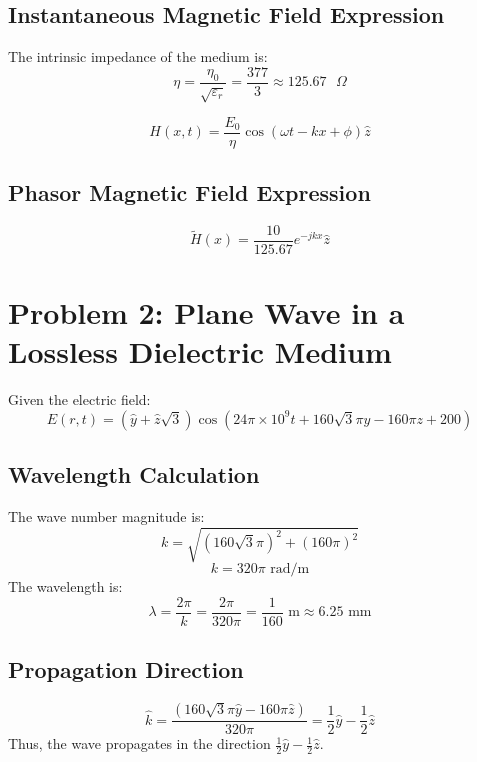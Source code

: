 \documentclass{include/src/sbu-report}  %
\begin{document}
\subsection{Instantaneous Magnetic Field Expression}
The intrinsic impedance of the medium is:
\begin{equation}
    \eta = \frac{\eta_0}{\sqrt{\varepsilon_r}} = \frac{377}{3} \approx 125.67 \text{ } \Omega
\end{equation}

\begin{equation}
    H(x,t) = \frac{E_0}{\eta} \cos(\omega t - kx + \phi) \hat{z}
\end{equation}

\subsection{Phasor Magnetic Field Expression}
\begin{equation}
    \tilde{H}(x) = \frac{10}{125.67} e^{-jkx} \hat{z}
\end{equation}

\section{Problem 2: Plane Wave in a Lossless Dielectric Medium}
Given the electric field:
\begin{equation}
    E(r,t) = (\hat{y} + \hat{z} \sqrt{3}) \cos(24\pi \times 10^9 t + 160\sqrt{3}\pi y - 160\pi z + 200 )
\end{equation}

\subsection{Wavelength Calculation}
The wave number magnitude is:
\begin{equation}
    k = \sqrt{(160\sqrt{3}\pi)^2 + (160\pi)^2}
\end{equation}
\begin{equation}
    k = 320\pi \text{ rad/m}
\end{equation}
The wavelength is:
\begin{equation}
    \lambda = \frac{2\pi}{k} = \frac{2\pi}{320\pi} = \frac{1}{160} \text{ m} \approx 6.25 \text{ mm}
\end{equation}

\subsection{Propagation Direction}
\begin{equation}
    \hat{k} = \frac{(160\sqrt{3}\pi \hat{y} - 160\pi \hat{z})}{320\pi} = \frac{1}{2} \hat{y} - \frac{1}{2} \hat{z}
\end{equation}
Thus, the wave propagates in the direction $\frac{1}{2} \hat{y} - \frac{1}{2} \hat{z}$.
\end{document}
